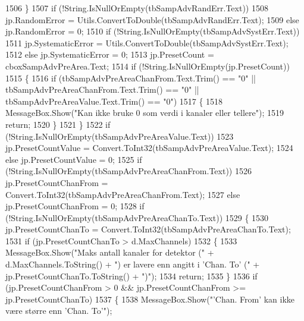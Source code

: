\begin{DoxyCode}
1506             \}
1507             \textcolor{keywordflow}{if} (!String.IsNullOrEmpty(tbSampAdvRandErr.Text))
1508                 jp.RandomError = Utils.ConvertToDouble(tbSampAdvRandErr.Text);
1509             \textcolor{keywordflow}{else} jp.RandomError = 0;
1510             \textcolor{keywordflow}{if} (!String.IsNullOrEmpty(tbSampAdvSystErr.Text))
1511                 jp.SystematicError = Utils.ConvertToDouble(tbSampAdvSystErr.Text);
1512             \textcolor{keywordflow}{else} jp.SystematicError = 0;
1513             jp.PresetCount = cboxSampAdvPreArea.Text;
1514             \textcolor{keywordflow}{if} (!String.IsNullOrEmpty(jp.PresetCount))
1515             \{
1516                 \textcolor{keywordflow}{if} (tbSampAdvPreAreaChanFrom.Text.Trim() == \textcolor{stringliteral}{"0"} || tbSampAdvPreAreaChanFrom.Text.Trim() == \textcolor{stringliteral}{
      "0"} || tbSampAdvPreAreaValue.Text.Trim() == \textcolor{stringliteral}{"0"})
1517                 \{
1518                     MessageBox.Show(\textcolor{stringliteral}{"Kan ikke bruke 0 som verdi i kanaler eller tellere"});
1519                     \textcolor{keywordflow}{return};
1520                 \}
1521             \}
1522             \textcolor{keywordflow}{if} (!String.IsNullOrEmpty(tbSampAdvPreAreaValue.Text))
1523                 jp.PresetCountValue = Convert.ToInt32(tbSampAdvPreAreaValue.Text);
1524             \textcolor{keywordflow}{else} jp.PresetCountValue = 0;
1525             \textcolor{keywordflow}{if} (!String.IsNullOrEmpty(tbSampAdvPreAreaChanFrom.Text))
1526                 jp.PresetCountChanFrom = Convert.ToInt32(tbSampAdvPreAreaChanFrom.Text);
1527             \textcolor{keywordflow}{else} jp.PresetCountChanFrom = 0;
1528             \textcolor{keywordflow}{if} (!String.IsNullOrEmpty(tbSampAdvPreAreaChanTo.Text))
1529             \{
1530                 jp.PresetCountChanTo = Convert.ToInt32(tbSampAdvPreAreaChanTo.Text);
1531                 \textcolor{keywordflow}{if} (jp.PresetCountChanTo > d.MaxChannels)
1532                 \{
1533                     MessageBox.Show(\textcolor{stringliteral}{"Maks antall kanaler for detektor ("} + d.MaxChannels.ToString() + \textcolor{stringliteral}{") er
       lavere enn angitt i 'Chan. To' ("} + jp.PresetCountChanTo.ToString() + \textcolor{stringliteral}{")"});
1534                     \textcolor{keywordflow}{return};
1535                 \}
1536                 \textcolor{keywordflow}{if} (jp.PresetCountChanFrom > 0 && jp.PresetCountChanFrom >= jp.PresetCountChanTo)
1537                 \{
1538                     MessageBox.Show(\textcolor{stringliteral}{"'Chan. From' kan ikke være større enn 'Chan. To'"});

\end{DoxyCode}
